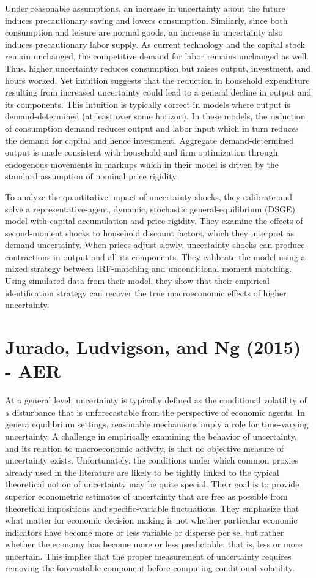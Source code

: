 \documentclass{article}
\begin{document}
{Under reasonable assumptions, an increase in uncertainty about the future induces precautionary saving and lowers consumption. Similarly, since both consumption and leisure are normal goods, an increase in uncertainty also induces precautionary labor supply. As current technology and the capital stock remain unchanged, the competitive demand for labor remains unchanged as well. Thus, higher uncertainty reduces consumption but raises output, investment, and hours worked. Yet intuition suggests that the reduction in household expenditure resulting from increased uncertainty could lead to a general decline in output and its components. This intuition is typically correct in models where output is demand-determined (at least over some horizon). In these models, the reduction of consumption demand reduces output and labor input which in turn reduces the demand for capital and hence investment. Aggregate demand-determined output is made consistent with household and firm optimization through endogenous movements in markups which in their model is driven by the standard assumption of nominal price rigidity.

To analyze the quantitative impact of uncertainty shocks, they calibrate and solve a representative-agent, dynamic, stochastic general-equilibrium (DSGE) model with capital accumulation and price rigidity. They examine the effects of second-moment shocks to household discount factors, which they interpret as demand uncertainty. When prices adjust slowly, uncertainty shocks can produce contractions in output and all its components. They calibrate the model using a mixed strategy between IRF-matching and unconditional moment matching. Using simulated data from their model, they show that their empirical identification strategy can recover the true macroeconomic effects of higher uncertainty. 


\section*{Jurado, Ludvigson, and Ng (2015) - AER}


At a general level, uncertainty is typically defined as the conditional volatility of a disturbance that is unforecastable from the perspective of economic agents. In genera equilibrium settings, reasonable mechanisms imply a role for time-varying uncertainty. A challenge in empirically examining the behavior of uncertainty, and its relation to macroeconomic activity, is that no objective measure of uncertainty exists. Unfortunately, the conditions under which common proxies already used in the literature are likely to be tightly linked to the typical theoretical notion of uncertainty may be quite special. Their goal is to provide superior econometric estimates of uncertainty that are free as possible from theoretical impositions and specific-variable fluctuations. They emphasize that what matter for economic decision making is not whether particular economic indicators have become more or less variable or disperse per se, but rather whether the economy has become more or less predictable; that is, less or more uncertain. This implies that the proper measurement of uncertainty requires removing the forecastable component before computing conditional volatility.

}
\end{document}
